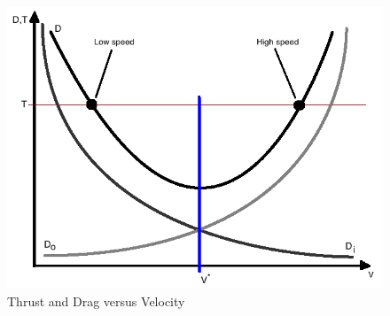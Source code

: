 \documentclass[letterpaper,11pt]{texMemo}
\begin{document}
\begin{figure}[here]
	\includegraphics[width=1\textwidth]{DragPlot.png}
	\caption{Thrust and Drag versus Velocity}
	\label{fig:Figure2}
\end{figure}
\end{document}
